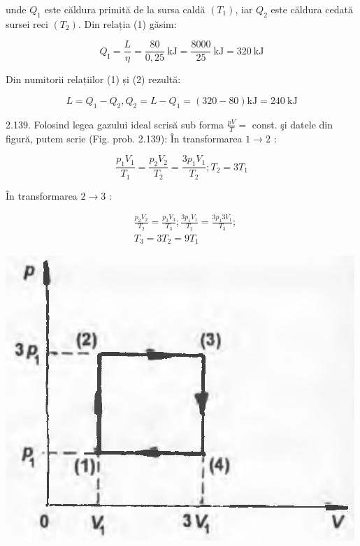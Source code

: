 \documentclass[10pt]{article}
\begin{document}
unde $Q_{1}$ este căldura primită de la sursa caldă $\left(T_{1}\right)$, iar $Q_{2}$ este căldura cedată sursei reci $\left(T_{2}\right)$. Din relația (1) găsim:

$$
Q_{\mathrm{I}}=\frac{L}{\eta}=\frac{80}{0,25} \mathrm{~kJ}=\frac{8000}{25} \mathrm{~kJ}=320 \mathrm{~kJ}
$$

Din numitorii relațiilor (1) și (2) rezultă:

$$
L=Q_{1}-Q_{2}, Q_{2}=L-Q_{1}=(320-80) \mathrm{kJ}=240 \mathrm{~kJ}
$$

2.139. Folosind legea gazului ideal scrisă sub forma $\frac{p V}{T}=$ const. şi datele din figură, putem scrie (Fig. prob. 2.139): În transformarea $1 \rightarrow 2$ :


\begin{equation*}
\frac{p_{1} V_{1}}{T_{1}}=\frac{p_{2} V_{2}}{T_{2}}=\frac{3 p_{1} V_{1}}{T_{2}} ; T_{2}=3 T_{1} \tag{1}
\end{equation*}


În transformarea $2 \rightarrow 3$ :


\begin{align*}
& \frac{p_{2} V_{2}}{T_{2}}=\frac{p_{3} V_{3}}{T_{3}} ; \frac{3 p_{1} V_{1}}{T_{2}}=\frac{3 p_{1} 3 V_{1}}{T_{3}} ;  \tag{2}\\
& T_{3}=3 T_{2}=9 T_{1}
\end{align*}


\begin{center}
\includegraphics[max width=\textwidth]{2025_07_01_5b3ff9fa0d508c8e9f17g-297}
\end{center}
\end{document}

